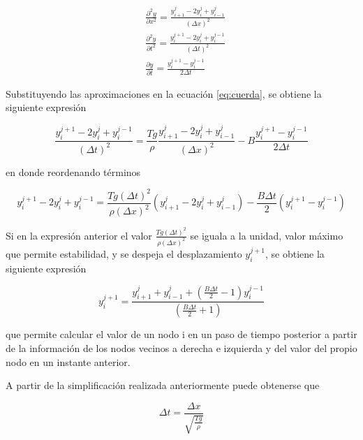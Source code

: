 \documentclass[11pt]{article}
\begin{document}
\begin{subequations}
\begin{flalign}
	&\frac{\partial^2 y}{\partial{x^2}} = \frac{y^j_{i+1} - 2y^j_i + y^j_{i-1}}{(\Delta{x})^2}\\
	&\frac{\partial^2 y}{\partial{t^2}} = \frac{y^{j+1}_i - 2y^j_i + y^{j-1}_i}{(\Delta{t})^2}\\
	&\frac{\partial{y}}{\partial{t}} = \frac{y^{j+1}_i - y^{j-1}_i}{2\Delta{t}}
\end{flalign}
\end{subequations}

Substituyendo las aproximaciones en la ecuación \eqref{eq:cuerda}, se obtiene la siguiente
expresión

\begin{equation}
\frac{y^{j+1}_i - 2y^j_i + y^{j-1}_i}{(\Delta{t})^2} = 
	\frac{Tg}{\rho}\frac{y^j_{i+1} - 2y^j_i + y^j_{i-1}}{(\Delta{x})^2}
	- B \frac{y^{j+1}_i - y^{j-1}_i}{2\Delta{t}}
\end{equation}

en donde reordenando términos 

\begin{equation}
y^{j+1}_{i} - 2y^{j}_i + y^{j-1}_i = \frac{Tg(\Delta{t})^2}{\rho(\Delta{x})^2}
	(y^j_{i+1} - 2y^j_i + y^j_{i-1}) - \frac{B\Delta{t}}{2}(y^{j+1}_i - y^{j-1}_i)
\label{eq:aproximacion}
\end{equation}

Si en la expresión anterior el valor $\frac{Tg(\Delta{t})^2}{\rho(\Delta{x})^2}$ se iguala
a la unidad, valor máximo que permite estabilidad, y se despeja el desplazamiento $y^{j+1}_i$,
se obtiene la siguiente expresión

\begin{equation}
y^{j+1}_i = \frac{y^j_{i+1} + y^j_{i-1} + (\frac{B\Delta{t}}{2} - 1)y^{j-1}_i}{(\frac{B\Delta{t}}{2} + 1)}
\label{eq:pasos_siguientes}
\end{equation}

que permite calcular el valor de un nodo i en un paso de tiempo posterior a partir de la
información de los nodos vecinos a derecha e izquierda y del valor del propio nodo en un
instante anterior.

A partir de la simplificación realizada anteriormente puede obtenerse que 

\begin{equation}
\Delta{t} = \frac{\Delta{x}}{\sqrt{\frac{Tg}{\rho}}}
\label{eq:paso_tiempo}
\end{equation}
\end{document}
